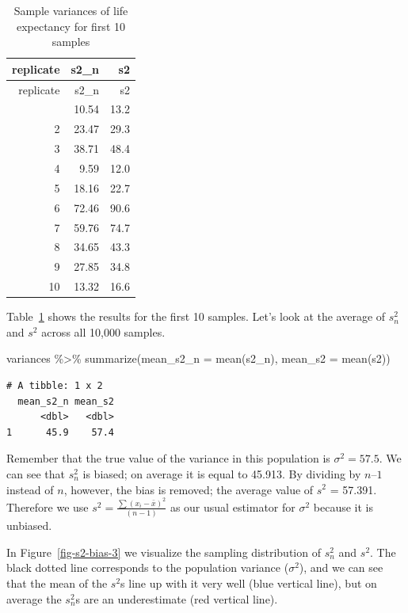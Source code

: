 \documentclass[
  letterpaper,
  DIV=11,
  numbers=noendperiod]{scrreprt}
\newenvironment{Shaded}{\begin{snugshade}}{\end{snugshade}}
\newcommand{\AttributeTok}[1]{\textcolor[rgb]{0.40,0.45,0.13}{#1}}
\newcommand{\FunctionTok}[1]{\textcolor[rgb]{0.28,0.35,0.67}{#1}}
\newcommand{\NormalTok}[1]{\textcolor[rgb]{0.00,0.23,0.31}{#1}}
\newcommand{\SpecialCharTok}[1]{\textcolor[rgb]{0.37,0.37,0.37}{#1}}
\theoremstyle{definition}
\theoremstyle{remark}
\begin{document}
\hypertarget{tbl-s2-bias-2}{}
\begin{longtable}[]{@{}rrr@{}}
\caption{\label{tbl-s2-bias-2}Sample variances of life expectancy for
first 10 samples}\tabularnewline
\toprule\noalign{}
replicate & s2\_n & s2 \\
\midrule\noalign{}
\endfirsthead
\toprule\noalign{}
replicate & s2\_n & s2 \\
\midrule\noalign{}
\endhead
\bottomrule\noalign{}
\endlastfoot
1 & 10.54 & 13.2 \\
2 & 23.47 & 29.3 \\
3 & 38.71 & 48.4 \\
4 & 9.59 & 12.0 \\
5 & 18.16 & 22.7 \\
6 & 72.46 & 90.6 \\
7 & 59.76 & 74.7 \\
8 & 34.65 & 43.3 \\
9 & 27.85 & 34.8 \\
10 & 13.32 & 16.6 \\
\end{longtable}

Table~\ref{tbl-s2-bias-2} shows the results for the first 10 samples.
Let's look at the average of \(s_n^2\) and \(s^2\) across all 10,000
samples.

\begin{Shaded}
\begin{Highlighting}[]
\NormalTok{variances }\SpecialCharTok{\%\textgreater{}\%}  
  \FunctionTok{summarize}\NormalTok{(}\AttributeTok{mean\_s2\_n =} \FunctionTok{mean}\NormalTok{(s2\_n),}
            \AttributeTok{mean\_s2   =} \FunctionTok{mean}\NormalTok{(s2))}
\end{Highlighting}
\end{Shaded}

\begin{verbatim}
# A tibble: 1 x 2
  mean_s2_n mean_s2
      <dbl>   <dbl>
1      45.9    57.4
\end{verbatim}

Remember that the true value of the variance in this population is
\(\sigma^2 = 57.5\). We can see that \(s_n^2\) is biased; on average it
is equal to 45.913. By dividing by \(n – 1\) instead of \(n\), however,
the bias is removed; the average value of \(s^2\) = 57.391. Therefore we
use \(s^2= \frac{\sum(x_i - \bar{x})^2}{(n-1)}\) as our usual estimator
for \(\sigma^2\) because it is unbiased.

In Figure~\ref{fig-s2-bias-3} we visualize the sampling distribution of
\(s_n^2\) and \(s^2\). The black dotted line corresponds to the
population variance (\(\sigma^2\)), and we can see that the mean of the
\(s^2\)s line up with it very well (blue vertical line), but on average
the \(s_n^2\)s are an underestimate (red vertical line).
\end{document}
